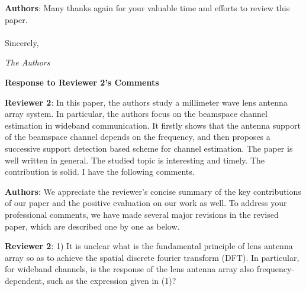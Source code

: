 \documentclass[a4paper,12pt]{article}
\begin{document}
\vbox{}

{\color{blue} \textbf{Authors}: Many thanks again for your valuable time and efforts to review this paper.
\\
\\
Sincerely,

 {\it The Authors}}


\clearpage
\begin{center}
 {\Large\bf Response to Reviewer 2's Comments}
\end{center}

\textbf{Reviewer 2}: In this paper, the authors study a millimeter wave lens antenna array system. In particular, the authors focus on the beamspace channel estimation in wideband communication. It firstly shows that the antenna support of the beamspace channel depends on the frequency, and then proposes a successive support detection based scheme for channel estimation. The paper is well written in general. The studied topic is interesting and timely. The contribution is solid. I have the following comments.


{\color{blue} \textbf{Authors}: We appreciate the reviewer's concise summary of the key contributions of our paper and the positive evaluation on our work as well. To address your professional comments, we have made several major revisions in the revised paper, which are described one by one as below.
}

\textbf{Reviewer 2}: 1) It is unclear what is the fundamental principle of lens antenna array so as to achieve the spatial discrete fourier transform (DFT). In particular,  for wideband channels, is the response of the lens antenna array also frequency-dependent, such as the expression given in (1)?
\end{document}
